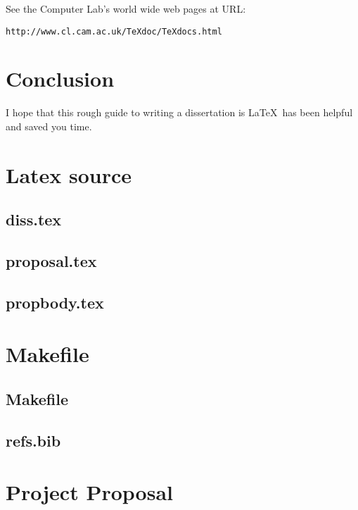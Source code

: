 \documentclass[12pt,twoside,notitlepage]{report}
\begin{document}
See the Computer Lab's world wide web pages at URL:

{\tt http://www.cl.cam.ac.uk/TeXdoc/TeXdocs.html}


\cleardoublepage
\chapter{Conclusion}

I hope that this rough guide to writing a dissertation is \LaTeX\ has
been helpful and saved you time.




\cleardoublepage



\cleardoublepage

\appendix

\chapter{Latex source}

\section{diss.tex}
{\scriptsize}

\section{proposal.tex}
{\scriptsize}

\section{propbody.tex}
{\scriptsize}



\cleardoublepage

\chapter{Makefile}

\section{\label{makefile}Makefile}
{\scriptsize}

\section{refs.bib}
{\scriptsize}


\cleardoublepage

\chapter{Project Proposal}


\end{document}
